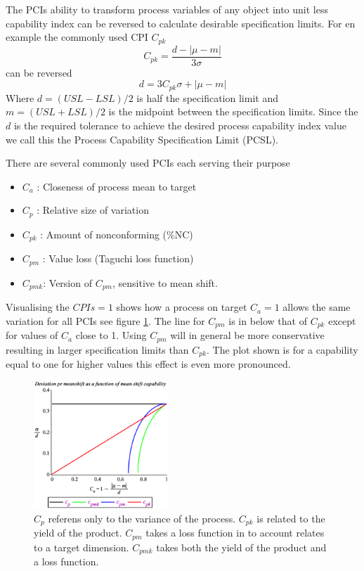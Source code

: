 \documentclass[aip,amsmath, reprint, author-year]{revtex4-1}
\begin{document}
The PCIs ability to transform process variables of any object into unit less capability index can be reversed to calculate desirable specification limits. For en example the commonly used CPI $C_{pk}$ 
\begin{equation}
	C_{pk} = \frac{d - | \mu - m|}{3 \sigma}
\end{equation}
can be reversed
\begin{equation}
	d = 3 C_{pk} \sigma + | \mu - m|
\end{equation}
Where $d = (USL - LSL) / 2$ is half the specification limit and $m = (USL + LSL) / 2$ is the midpoint between the specification limits. Since the $d$ is the required tolerance to achieve the desired process capability index value we call this the Process Capability Specification Limit (PCSL). 

There are several commonly used PCIs each serving their purpose \citep{wu2009overview, taguchi1986introduction}
\begin{itemize}
	\item $C_a$ : Closeness of process mean to target 
	\item $C_p$ : Relative size of variation
	\item $C_{pk}$ : Amount of nonconforming (\%NC)
	\item $C_{pm}$ : Value loss (Taguchi loss function)
	\item $C_{pmk}$: Version of $C_{pm}$,  sensitive to mean shift. 
\end{itemize}

Visualising the $CPIs = 1$  shows how a process on target $C_a = 1$ allows the same variation for all PCIs see figure \ref{fig:CPI}. The line for $C_{pm}$ is in below that of $C_{pk}$ except for values of $C_a$ close to 1. 
Using $C_{pm}$ will in general be more conservative resulting in larger specification limits than $C_{pk}$. The plot shown is for a capability equal to one for higher values this effect is even more pronounced.

\begin{figure}
\includegraphics[width=0.45\textwidth]{graph_postscript_test.eps}
\caption{\label{fig:CPI} $C_p$ referens only to the variance of the process. $C_{pk}$ is related to the yield of the product. $C_{pm}$ takes a loss function in to account relates to a target dimension. $C_{pmk}$ takes both the yield of the product and a loss function. }
\end{figure}
\end{document}
